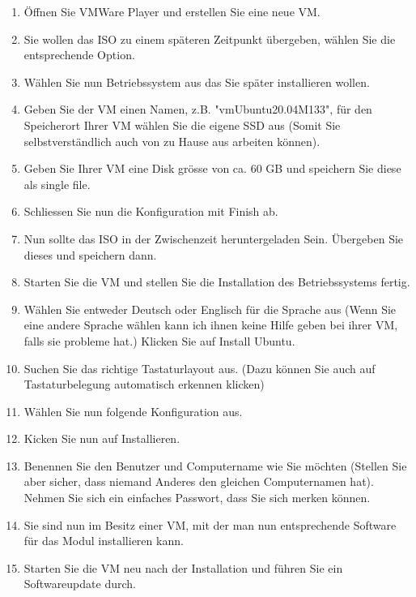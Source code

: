 \begin{frame}[fragile]
    \begin{enumerate}
        \item Öffnen Sie VMWare Player und erstellen Sie eine neue VM.
        \item Sie wollen das ISO zu einem späteren Zeitpunkt übergeben, wählen Sie die entsprechende Option.
        \item Wählen Sie nun Betriebssystem aus das Sie später installieren wollen.
         \newpage
        \item Geben Sie der VM einen Namen, z.B. "vmUbuntu20.04\textunderscore M133", für den Speicherort Ihrer VM wählen Sie die eigene
        SSD aus (Somit Sie selbstverständlich auch von zu Hause aus arbeiten können).
        \item Geben Sie Ihrer VM eine Disk grösse von ca. 60 GB und speichern Sie diese als single file.
        \item Schliessen Sie nun die Konfiguration mit Finish ab.
        \item Nun sollte das ISO in der Zwischenzeit heruntergeladen Sein.
        Übergeben Sie dieses und speichern dann.
        \item Starten Sie die VM und stellen Sie die Installation des Betriebssystems fertig.
        \item Wählen Sie entweder Deutsch oder Englisch für die Sprache aus (Wenn Sie eine andere Sprache wählen kann ich ihnen keine Hilfe geben bei ihrer VM, falls sie probleme hat.)
        Klicken Sie auf Install Ubuntu.
        \item Suchen Sie das richtige Tastaturlayout aus. (Dazu können Sie auch auf Tastaturbelegung automatisch erkennen klicken) \newpage
        \item Wählen Sie nun folgende Konfiguration aus.
        \item Kicken Sie nun auf Installieren.
        \item Benennen Sie den Benutzer und Computername wie Sie möchten (Stellen Sie aber sicher, dass niemand Anderes den gleichen Computernamen hat).
        Nehmen Sie sich ein einfaches Passwort, dass Sie sich merken können.
        \item Sie sind nun im Besitz einer VM, mit der man nun entsprechende Software für das Modul installieren kann.
        \item Starten Sie die VM neu nach der Installation und führen Sie ein Softwareupdate durch.
    \end{enumerate}
\end{frame}


